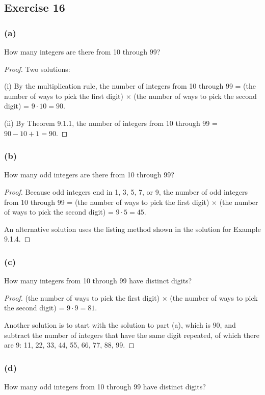 \documentclass[14pt]{extarticle}
\begin{document}
\subsection{Exercise 16}
\subsubsection{(a)}
How many integers are there from 10 through 99?

\begin{proof}
Two solutions:

(i) By the multiplication rule, the number of integers from 10 through 99 = (the number of ways to pick the first 
digit) \(\times\) (the number of ways to pick the second digit) = \(9 \cdot 10 = 90\).

(ii) By Theorem 9.1.1, the number of integers from 10 through 99 = \(90 - 10 + 1 = 90\).
\end{proof}

\subsubsection{(b)}
How many odd integers are there from 10 through 99?

\begin{proof}
Because odd integers end in 1, 3, 5, 7, or 9, the number of odd integers from 10 through 99 = (the number of ways to 
pick the first digit) \(\times\) (the number of ways to pick the second digit) = \(9 \cdot 5 = 45\).

An alternative solution uses the listing method shown in the solution for Example 9.1.4.
\end{proof}

\subsubsection{(c)}
How many integers from 10 through 99 have distinct digits?

\begin{proof}
(the number of ways to pick the first digit) \(\times\) (the number of ways to pick the second digit) = 
\(9 \cdot 9 = 81\).

Another solution is to start with the solution to part (a), which is 90, and subtract the number of integers that have 
the same digit repeated, of which there are 9: 11, 22, 33, 44, 55, 66, 77, 88, 99.
\end{proof}

\subsubsection{(d)}
How many odd integers from 10 through 99 have distinct digits?
\end{document}
